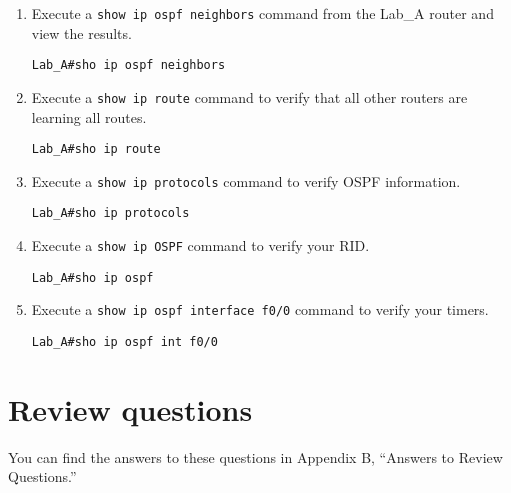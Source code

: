 \begin{enumerate}
\item
  Execute a \texttt{show\ ip\ ospf\ neighbors} command from the Lab\_A
  router and view the results.

\begin{verbatim}
Lab_A#sho ip ospf neighbors
\end{verbatim}
\item
  Execute a \texttt{show\ ip\ route} command to verify that all other
  routers are learning all routes.

\begin{verbatim}
Lab_A#sho ip route
\end{verbatim}
\item
  Execute a \texttt{show\ ip\ protocols} command to verify OSPF
  information.

\begin{verbatim}
Lab_A#sho ip protocols
\end{verbatim}
\item
  Execute a \texttt{show\ ip\ OSPF} command to verify your RID.

\begin{verbatim}
Lab_A#sho ip ospf
\end{verbatim}
\item
  Execute a \texttt{show\ ip\ ospf\ interface\ f0/0} command to verify
  your timers.

\begin{verbatim}
Lab_A#sho ip ospf int f0/0
\end{verbatim}
\end{enumerate}



\section{Review questions}

You can find the answers to these questions in Appendix B, ``Answers to
Review Questions.''


